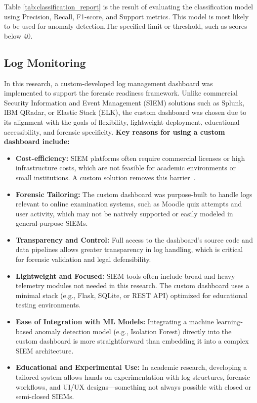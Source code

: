 Table \ref{tab:classification_report} is the result of evaluating the classification model using Precision, Recall, F1-score, and Support metrics. This model is most likely to be used for anomaly detection.The specified limit or threshold, such as scores below 40.


\subsection{Log Monitoring}
In this research, a custom-developed log management dashboard was implemented to support the forensic readiness framework. Unlike commercial Security Information and Event Management (SIEM) solutions such as Splunk, IBM QRadar, or Elastic Stack (ELK), the custom dashboard was chosen due to its alignment with the goals of flexibility, lightweight deployment, educational accessibility, and forensic specificity.
\textbf{Key reasons for using a custom dashboard include:}

\begin{itemize}
	\item \textbf{Cost-efficiency:} SIEM platforms often require commercial licenses or high infrastructure costs, which are not feasible for academic environments or small institutions. A custom solution removes this barrier~\cite{barker2018openlogtools}.
	
	\item \textbf{Forensic Tailoring:} The custom dashboard was purpose-built to handle logs relevant to online examination systems, such as Moodle quiz attempts and user activity, which may not be natively supported or easily modeled in general-purpose SIEMs.
	
	\item \textbf{Transparency and Control:} Full access to the dashboard's source code and data pipelines allows greater transparency in log handling, which is critical for forensic validation and legal defensibility.
	
	\item \textbf{Lightweight and Focused:} SIEM tools often include broad and heavy telemetry modules not needed in this research. The custom dashboard uses a minimal stack (e.g., Flask, SQLite, or REST API) optimized for educational testing environments.
	
	\item \textbf{Ease of Integration with ML Models:} Integrating a machine learning-based anomaly detection model (e.g., Isolation Forest) directly into the custom dashboard is more straightforward than embedding it into a complex SIEM architecture.
	
	\item \textbf{Educational and Experimental Use:} In academic research, developing a tailored system allows hands-on experimentation with log structures, forensic workflows, and UI/UX designs—something not always possible with closed or semi-closed SIEMs.
\end{itemize}

